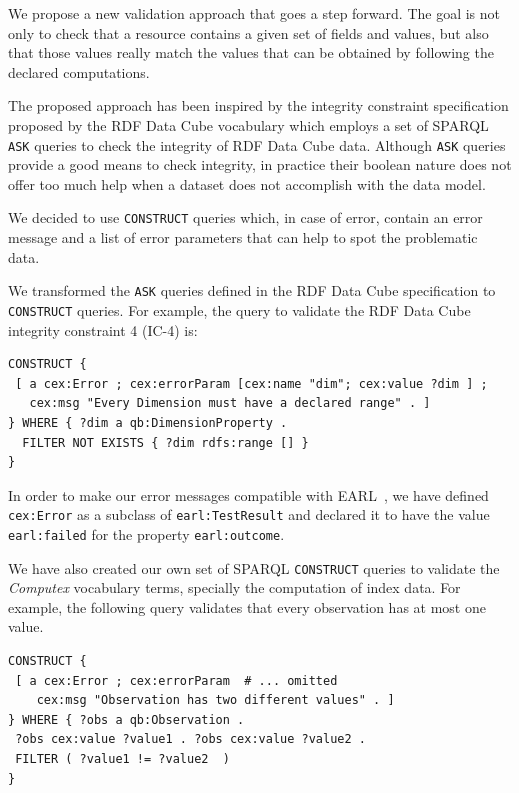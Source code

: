 \documentclass{acm_proc_article-sp}
\begin{document}
We propose a new validation approach that goes a step forward. 
The goal is not only to check that a resource contains a given set of fields and values, but also that those values really match
the values that can be obtained by following the declared computations.
 
The proposed approach has been inspired by the integrity
constraint specification proposed by the RDF Data Cube vocabulary 
which employs a set of SPARQL
 \lstinline|ASK| queries to check the integrity of RDF Data Cube data. 
 Although \lstinline|ASK| queries provide a good means to check integrity, in
 practice their boolean nature does not offer too much help when a 
 dataset does not accomplish with the data model.

We decided to use \lstinline|CONSTRUCT| queries which, in case of error, 
  contain an error message and a list of error parameters that can help to spot
  the problematic data.

 We transformed the \lstinline|ASK| queries defined in the RDF Data Cube
 specification to \lstinline|CONSTRUCT| queries. For example, the
 query to validate the RDF Data Cube integrity constraint 4 (IC-4) is:
 
\begin{lstlisting}[style=SPARQL]
CONSTRUCT {
 [ a cex:Error ; cex:errorParam [cex:name "dim"; cex:value ?dim ] ;
   cex:msg "Every Dimension must have a declared range" . ]
} WHERE { ?dim a qb:DimensionProperty .
  FILTER NOT EXISTS { ?dim rdfs:range [] }
}
\end{lstlisting}
 
In order to make our error messages compatible with EARL~\cite{EARL}, we have
 defined \lstinline|cex:Error| as a subclass of \lstinline|earl:TestResult| and 
 declared it to have the value \lstinline|earl:failed| for the property
 \lstinline|earl:outcome|.
 
We have also created our own set of SPARQL \lstinline|CONSTRUCT| queries to
validate the \emph{Computex} vocabulary terms, specially the computation of index data.
For example, the following query validates that every observation 
  has at most one value.
 
\begin{lstlisting}[style=SPARQL]
CONSTRUCT {
 [ a cex:Error ; cex:errorParam  # ... omitted 
    cex:msg "Observation has two different values" . ]
} WHERE { ?obs a qb:Observation . 
 ?obs cex:value ?value1 . ?obs cex:value ?value2 .
 FILTER ( ?value1 != ?value2  )
}
\end{lstlisting}
\end{document}
